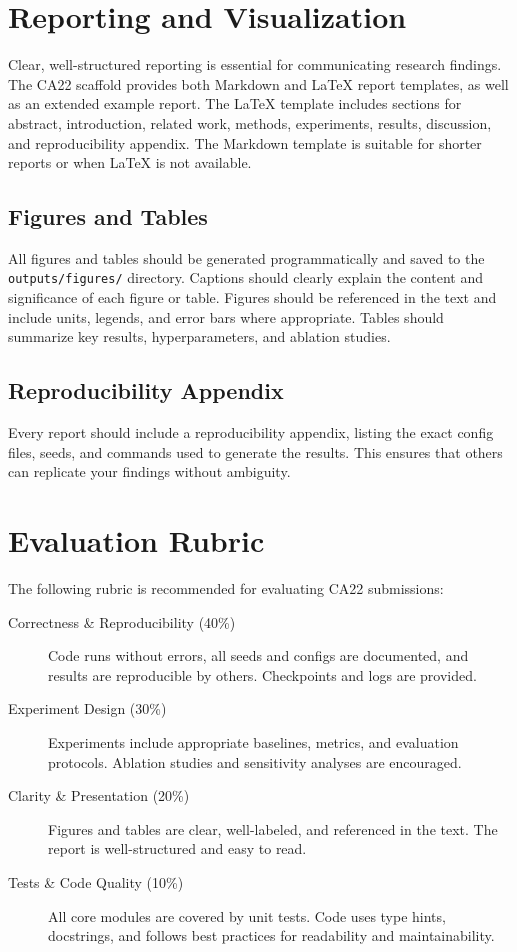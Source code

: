 \documentclass[11pt]{article}
\begin{document}
\section{Reporting and Visualization}
Clear, well-structured reporting is essential for communicating research findings. The CA22 scaffold provides both Markdown and LaTeX report templates, as well as an extended example report. The LaTeX template includes sections for abstract, introduction, related work, methods, experiments, results, discussion, and reproducibility appendix. The Markdown template is suitable for shorter reports or when LaTeX is not available.

\subsection{Figures and Tables}
All figures and tables should be generated programmatically and saved to the \texttt{outputs/figures/} directory. Captions should clearly explain the content and significance of each figure or table. Figures should be referenced in the text and include units, legends, and error bars where appropriate. Tables should summarize key results, hyperparameters, and ablation studies.

\subsection{Reproducibility Appendix}
Every report should include a reproducibility appendix, listing the exact config files, seeds, and commands used to generate the results. This ensures that others can replicate your findings without ambiguity.


\section{Evaluation Rubric}
The following rubric is recommended for evaluating CA22 submissions:
\begin{description}
  \item[Correctness \& Reproducibility (40\%)] Code runs without errors, all seeds and configs are documented, and results are reproducible by others. Checkpoints and logs are provided.
  \item[Experiment Design (30\%)] Experiments include appropriate baselines, metrics, and evaluation protocols. Ablation studies and sensitivity analyses are encouraged.
  \item[Clarity \& Presentation (20\%)] Figures and tables are clear, well-labeled, and referenced in the text. The report is well-structured and easy to read.
  \item[Tests \& Code Quality (10\%)] All core modules are covered by unit tests. Code uses type hints, docstrings, and follows best practices for readability and maintainability.
\end{description}
\end{document}
